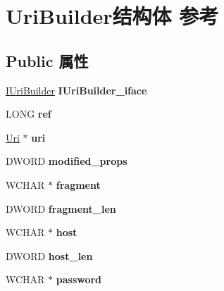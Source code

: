 \hypertarget{struct_uri_builder}{}\section{Uri\+Builder结构体 参考}
\label{struct_uri_builder}
\subsection*{Public 属性}
\begin{DoxyCompactItemize}
\item 
\mbox{\label{struct_uri_builder_a8f1cf8355764e73ea6650137c3ea20bd}} 
\hyperlink{interface_i_uri_builder}{I\+Uri\+Builder} {\bfseries I\+Uri\+Builder\+\_\+iface}
\item 
\mbox{\label{struct_uri_builder_a254c8b9175e7ab818e3745dc592ff723}} 
L\+O\+NG {\bfseries ref}
\item 
\mbox{\label{struct_uri_builder_a96fb7ee66b6920323d2c905030db44f4}} 
\hyperlink{struct_uri}{Uri} $\ast$ {\bfseries uri}
\item 
\mbox{\label{struct_uri_builder_a238c5cd4a1f29d85b82138deccb3bedd}} 
D\+W\+O\+RD {\bfseries modified\+\_\+props}
\item 
\mbox{\label{struct_uri_builder_a8d8386dad644126b83b6b77f97733d2f}} 
W\+C\+H\+AR $\ast$ {\bfseries fragment}
\item 
\mbox{\label{struct_uri_builder_ad29bc108d8d10195dd3e2d739918db22}} 
D\+W\+O\+RD {\bfseries fragment\+\_\+len}
\item 
\mbox{\label{struct_uri_builder_ab70459c80d6ebe524cd4cfcd98c2a95b}} 
W\+C\+H\+AR $\ast$ {\bfseries host}
\item 
\mbox{\label{struct_uri_builder_aa4de9920e3d335ebce4bbb7406b7a281}} 
D\+W\+O\+RD {\bfseries host\+\_\+len}
\item 
\mbox{\label{struct_uri_builder_affbe2f9a3814da095ab0008338797a23}} 
W\+C\+H\+AR $\ast$ {\bfseries password}
\item 

\end{DoxyCompactItemize}
